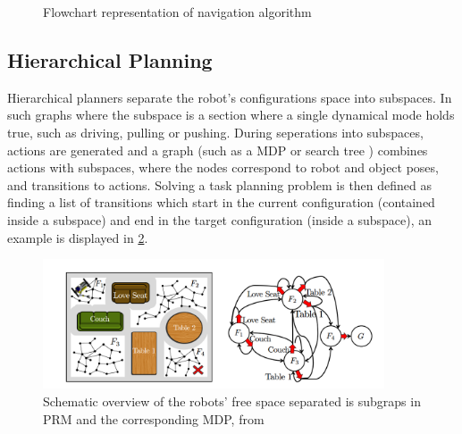 \begin{figure} \centering
{}
\caption{Flowchart representation of navigation algorithm \cite{wang_affordance-based_2020}}
\label{figure: navigation_algorithm}
\end{figure}


\subsection{Hierarchical Planning}
\label{subsection: hierarchical_planning}
Hierarchical planners separate the robot's configurations space into subspaces. In such graphs where the subspace is a section where a single dynamical mode holds true, such as driving, pulling or pushing. During seperations into subspaces, actions are generated and a graph (such as a \ac{MDP} or search tree \cite{bronson_practical_2010}) combines actions with subspaces, where the nodes correspond to robot and object poses, and transitions to actions. Solving a task planning problem is then defined as finding a list of transitions which start in the current configuration (contained inside a subspace) and end in the target configuration (inside a subspace), an example is displayed in \cref{figure: example_hierarchical_planning}.\\

\begin{figure}[!h]
    \centering
    \includegraphics[width=0.9\textwidth]{figures/construct_hierarchical_planner.png}
    \caption{Schematic overview of the robots' free space separated is subgraps in \acs{PRM} and the corresponding \acs{MDP}, from \cite{scholz_navigation_2016}
    }
    \label{figure: example_hierarchical_planning}
\end{figure}

